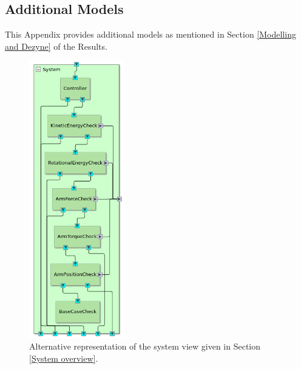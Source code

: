 \documentclass[12pt]{scrreprt}
\begin{document}

\begin{appendices}
\chapter{Additional Models}
\label{Additional Models}
This Appendix provides additional models as mentioned in Section \ref{Modelling and Dezyne} of the Results.

\begin{figure}[H]
    \centering
    \includegraphics[width=0.37\textwidth]{Figures/results/modelling_figures/system_view/system_view_alt.png}
    \caption{Alternative representation of the system view given in Section \ref{System overview}.}
    \label{fig:system_view_alt}
\end{figure}



\end{appendices}
\end{document}
